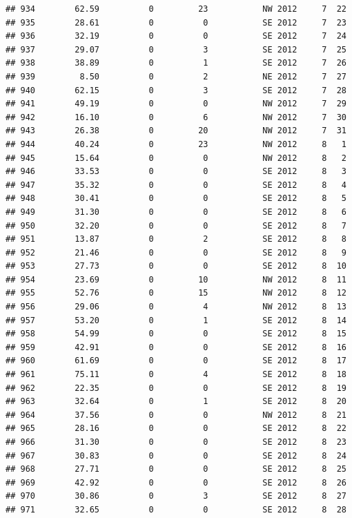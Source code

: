 \documentclass[
]{article}
\begin{document}
\begin{verbatim}
## 934        62.59          0         23           NW 2012     7  22
## 935        28.61          0          0           SE 2012     7  23
## 936        32.19          0          0           SE 2012     7  24
## 937        29.07          0          3           SE 2012     7  25
## 938        38.89          0          1           SE 2012     7  26
## 939         8.50          0          2           NE 2012     7  27
## 940        62.15          0          3           SE 2012     7  28
## 941        49.19          0          0           NW 2012     7  29
## 942        16.10          0          6           NW 2012     7  30
## 943        26.38          0         20           NW 2012     7  31
## 944        40.24          0         23           NW 2012     8   1
## 945        15.64          0          0           NW 2012     8   2
## 946        33.53          0          0           SE 2012     8   3
## 947        35.32          0          0           SE 2012     8   4
## 948        30.41          0          0           SE 2012     8   5
## 949        31.30          0          0           SE 2012     8   6
## 950        32.20          0          0           SE 2012     8   7
## 951        13.87          0          2           SE 2012     8   8
## 952        21.46          0          0           SE 2012     8   9
## 953        27.73          0          0           SE 2012     8  10
## 954        23.69          0         10           NW 2012     8  11
## 955        52.76          0         15           NW 2012     8  12
## 956        29.06          0          4           NW 2012     8  13
## 957        53.20          0          1           SE 2012     8  14
## 958        54.99          0          0           SE 2012     8  15
## 959        42.91          0          0           SE 2012     8  16
## 960        61.69          0          0           SE 2012     8  17
## 961        75.11          0          4           SE 2012     8  18
## 962        22.35          0          0           SE 2012     8  19
## 963        32.64          0          1           SE 2012     8  20
## 964        37.56          0          0           NW 2012     8  21
## 965        28.16          0          0           SE 2012     8  22
## 966        31.30          0          0           SE 2012     8  23
## 967        30.83          0          0           SE 2012     8  24
## 968        27.71          0          0           SE 2012     8  25
## 969        42.92          0          0           SE 2012     8  26
## 970        30.86          0          3           SE 2012     8  27
## 971        32.65          0          0           SE 2012     8  28

\end{verbatim}
\end{document}
